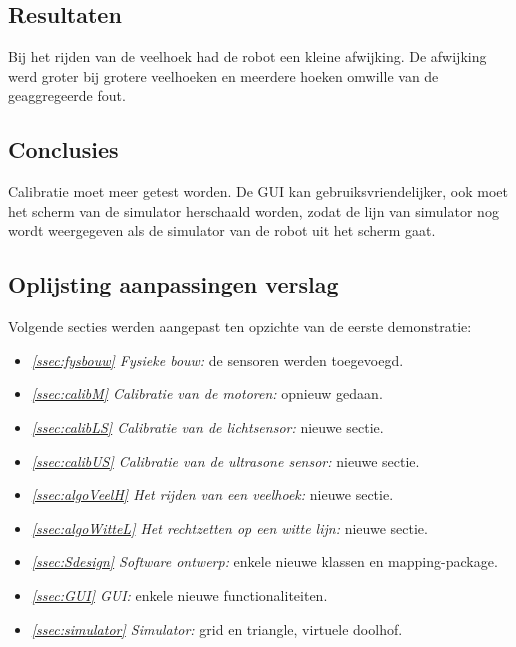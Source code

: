 \documentclass[t1]{penoverslag}
\begin{document}
\subsection{Resultaten} %
\label{Assec:result1}
Bij het rijden van de veelhoek had de robot een kleine afwijking. De afwijking werd groter bij grotere veelhoeken en meerdere hoeken omwille van de geaggregeerde fout.

\subsection{Conclusies} %
\label{Assec:conc1}
Calibratie moet meer getest worden. De GUI kan gebruiksvriendelijker, ook moet het scherm van de simulator herschaald worden, zodat de lijn van simulator nog wordt weergegeven als de simulator van de robot uit het scherm gaat.

\subsection{Oplijsting aanpassingen verslag} %
\label{Assec:aanp1}
Volgende secties werden aangepast ten opzichte van de eerste demonstratie:

\begin{itemize}
\item \textit{\ref{ssec:fysbouw} Fysieke bouw:} de sensoren werden toegevoegd.
\item \textit{\ref{ssec:calibM} Calibratie van de motoren:} opnieuw gedaan.
\item \textit{\ref{ssec:calibLS} Calibratie van de lichtsensor:} nieuwe sectie.
\item \textit{\ref{ssec:calibUS} Calibratie van de ultrasone sensor:} nieuwe sectie.
\item \textit{\ref{ssec:algoVeelH} Het rijden van een veelhoek:} nieuwe sectie.
\item \textit{\ref{ssec:algoWitteL} Het rechtzetten op een witte lijn:} nieuwe sectie.
\item \textit{\ref{ssec:Sdesign} Software ontwerp:} enkele nieuwe klassen en mapping-package.
\item \textit{\ref{ssec:GUI} GUI:} enkele nieuwe functionaliteiten.
\item \textit{\ref{ssec:simulator} Simulator:} grid en triangle, virtuele doolhof.
\end{itemize}


\end{document}

